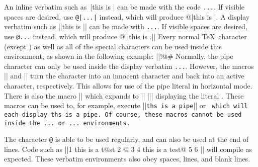 An inline verbatim such as\ |this is \inline| can be made with the code {\tt\pipe...\pipe}.
If visible spaces are desired, use 
{\tt @\string|...\string|} instead, which will produce @|this is \inline|.
A display verbatim such as
||this is \display||
can be made with {\tt\pipe\pipe...\pipe\pipe}.
If visible spaces are desired, use {\tt @\pipe\pipe...\pipe\pipe} instead, which will produce
@||this is \display.||
Every normal \TeX\ character (except {\tt\pipe}) as well as all of the special characters can be used inside this environment, as shown in the following example:
||!$@$#%
Normally, the pipe character {\tt\pipe} can only be used inside the display verbatim {\tt\pipe\pipe...\pipe\pipe}.
However, the macros |\makepipeother| and |\makepipeactive| turn the character {\tt\pipe} into an innocent character and back into an active character, respectively.
This allows for use of the pipe literal in horizontal mode.
There is also the macro |\pipe| which expands to
|| \bgroup\string|\egroup ||
displaying the literal {\tt\pipe}.
These macros can be used to, for example, execute
||{\tt th\pipe{}s is a pipe}||
or
\begindisplay
\tt
\makepipeother
\string\makepipeother{}\string\makepipeactive
\makepipeactive
\enddisplay
which will each display {\tt th\pipe{}s is a pipe}.
Of course, these macros cannot be used inside the {\tt\pipe...\pipe} or {\tt\pipe\pipe...\pipe\pipe} environments.

The character {\tt @} is able to be used regularly, and can also be used at the end of lines.
Code such as
||1 this is a t@st
2 @
3
4 this is a test@
5
6 \bye||
will compile as expected.
These verbatim environments also obey spaces, lines, and blank lines.

\bye